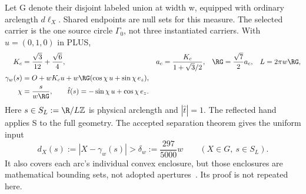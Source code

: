 Let G denote their disjoint labeled union at width w, equipped with ordinary arclength $d\ell_X$. Shared endpoints are null sets for this measure. The selected carrier is the one source circle $\Gamma_0$, not three instantiated carriers. With $u=(0,1,0)$ in PLUS,
\begin{align}
K_c&=\frac{\sqrt3}{12}+\frac{\sqrt6}{4},&
a_c&=\frac{K_c}{1+\sqrt3/2},&\RG&=\frac{\sqrt7}{2}a_c,&L&=2\pi w\RG,\label{eq:circleconstants}\\
\gamma_w(s)&=O+wK_cu+w\RG(\cos\chi\,u+\sin\chi\,e_z),\notag\\
\chi&=\frac{s}{w\RG},\qquad \hat t(s)=-\sin\chi\,u+\cos\chi\,e_z.\label{eq:circle}
\end{align}
Here $s\in S_L:=\R/L\mathbb Z$ is physical arclength and $|\hat t|=1$. The reflected hand applies S to the full geometry. The accepted separation theorem gives the uniform input
\begin{equation}\label{eq:clearance}
d_X(s):=|X-\gamma_w(s)|>\delta_w:=\frac{297}{5000}w
\qquad(X\in G,\ s\in S_L).
\end{equation}
It also covers each arc's individual convex enclosure, but those enclosures are mathematical bounding sets, not adopted apertures~\cite{centralpaper,SOreview}. Its proof is not repeated here.

